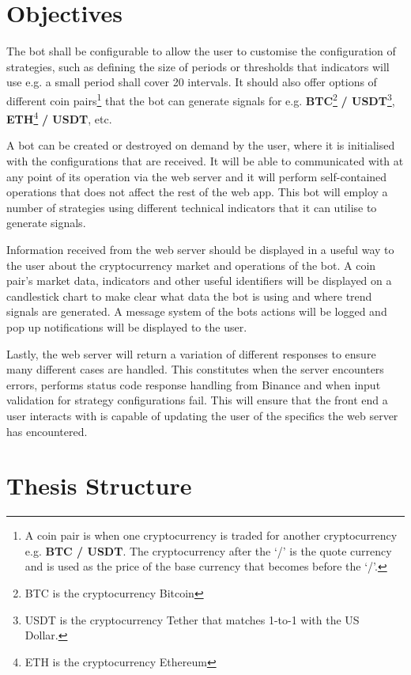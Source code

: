 \section{Objectives}
\label{sec:intro:objectives}
\noindent The bot shall be configurable to allow the user to customise the configuration of strategies, such as defining the size of periods or thresholds that indicators will use e.g. a small period shall cover 20 intervals. It should also offer options of different coin pairs\footnote{A coin pair is when one cryptocurrency is traded for another cryptocurrency e.g. \textbf{BTC / USDT}. The cryptocurrency after the `/' is the quote currency and is used as the price of the base currency that becomes before the `/'.} that the bot can generate signals for e.g. \textbf{BTC}\footnote{BTC is the cryptocurrency Bitcoin} \textbf{/ USDT}\footnote{USDT is the cryptocurrency Tether that matches 1-to-1 with the US Dollar.}, \textbf{ETH}\footnote{ETH is the cryptocurrency Ethereum} \textbf{/ USDT}, etc.

A bot can be created or destroyed on demand by the user, where it is initialised with the configurations that are received. It will be able to communicated with at any point of its operation via the web server and it will perform self-contained operations that does not affect the rest of the web app. This bot will employ a number of strategies using different technical indicators that it can utilise to generate signals.

Information received from the web server should be displayed in a useful way to the user about the cryptocurrency market and operations of the bot. A coin pair's market data, indicators and other useful identifiers will be displayed on a candlestick chart to make clear what data the bot is using and where trend signals are generated. A message system of the bots actions will be logged and pop up notifications will be displayed to the user.

Lastly, the web server will return a variation of different responses to ensure many different cases are handled. This constitutes when the server encounters errors, performs status code response handling from Binance and when input validation for strategy configurations fail. This will ensure that the front end a user interacts with is capable of updating the user of the specifics the web server has encountered.



\section{Thesis Structure}
\label{sec:intro:structure}

